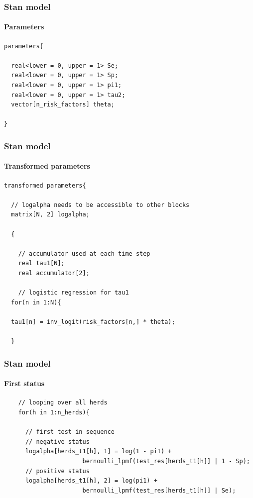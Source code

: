 \documentclass{beamer}
\begin{document}
\begin{frame}[fragile]
\frametitle{Stan model}
\framesubtitle{Parameters}
\scriptsize
\begin{verbatim}
parameters{

  real<lower = 0, upper = 1> Se;
  real<lower = 0, upper = 1> Sp;
  real<lower = 0, upper = 1> pi1;
  real<lower = 0, upper = 1> tau2;
  vector[n_risk_factors] theta;

}
\end{verbatim}
\end{frame}


\begin{frame}[fragile]
\frametitle{Stan model}
\framesubtitle{Transformed parameters}
\scriptsize
\begin{verbatim}
transformed parameters{

  // logalpha needs to be accessible to other blocks
  matrix[N, 2] logalpha;

  {

    // accumulator used at each time step
    real tau1[N];
    real accumulator[2];

    // logistic regression for tau1
  for(n in 1:N){

  tau1[n] = inv_logit(risk_factors[n,] * theta);

  }
\end{verbatim}

\end{frame}

\begin{frame}[fragile]
\frametitle{Stan model}
\framesubtitle{First status}
\scriptsize
\begin{verbatim}
    // looping over all herds
    for(h in 1:n_herds){

      // first test in sequence
      // negative status
      logalpha[herds_t1[h], 1] = log(1 - pi1) + 
                      bernoulli_lpmf(test_res[herds_t1[h]] | 1 - Sp);
      // positive status
      logalpha[herds_t1[h], 2] = log(pi1) + 
                      bernoulli_lpmf(test_res[herds_t1[h]] | Se);

 \end{verbatim}
\end{frame}
\end{document}
